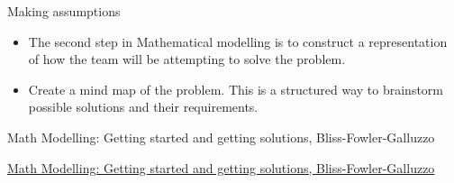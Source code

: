 	









\standardonlynewpage


%
%



\begin{module}{Making assumptions}
	\label{assumption}

\begin{siam}
	
	
\end{siam}
\end{module}
	



\begin{lesson}

	\begin{itemize}
		\item The second step in Mathematical modelling is to construct a representation of how the team will be attempting to solve the problem.
		\item Create a mind map of the problem. This is a structured way to brainstorm possible solutions and their requirements.
	\end{itemize}
	

\begin{annotation}
	\begin{goals}
	Math Modelling: Getting started and getting solutions, Bliss-Fowler-Galluzzo
	
	\hfill {}	
	\end{goals}
\end{annotation}
	 \href{https://m3challenge.siam.org/resources/modeling-handbook}{Math Modelling: Getting started and getting solutions, Bliss-Fowler-Galluzzo}

\end{lesson}





